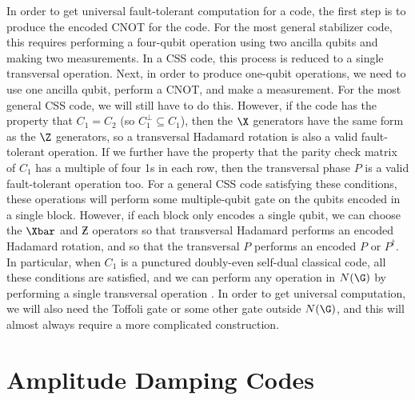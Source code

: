 In order to get universal fault-tolerant computation for a code, the first
step is to produce the encoded CNOT for the code.  For the most general
stabilizer code, this requires performing a four-qubit operation using
two ancilla qubits and making two measurements.  In a CSS code, this process
is reduced to a single transversal operation.  Next, in order to produce
one-qubit operations, we need to use one ancilla qubit, perform a CNOT, and
make a measurement.  For the most general CSS code, we will still have to
do this.  However, if the code has the property that $C_1 = C_2$ (so
$C_1^{\perp} \subseteq C_1$), then the $\X$ generators have the same form
as the $\Z$ generators, so a transversal Hadamard rotation is also a valid
fault-tolerant operation.  If we further have the property that the parity
check matrix of $C_1$ has a multiple of four 1s in each row, then the
transversal phase $P$ is a valid fault-tolerant operation too.  For a general
CSS code satisfying these conditions, these operations will perform some
multiple-qubit gate on the qubits encoded in a single block.  However, if each
block only encodes a single qubit, we can choose the $\Xbar$ and $\Zbar$
operators so that transversal Hadamard performs an encoded Hadamard rotation,
and so that the transversal $P$ performs an encoded $P$ or $P^\dagger$.  In
particular, when $C_1$ is a punctured doubly-even self-dual classical code,
all these conditions are satisfied, and we can perform any operation in
$N(\G)$ by performing a single transversal operation \cite{shor-fault-tol}.
In order to get universal computation, we will also need the Toffoli gate or
some other gate outside $N(\G)$, and this will almost always require a more
complicated construction.

\section{Amplitude Damping Codes}

